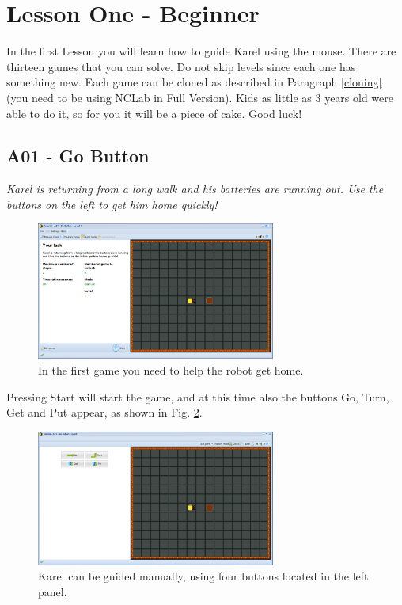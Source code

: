 \documentclass[article,A4,12pt]{llncs}
\begin{document}
\section{Lesson One - Beginner}

In the first Lesson you will learn how to guide Karel using the mouse.
There are thirteen games that you can solve. Do not skip levels since each one has something new. Each game can 
be cloned as described in Paragraph \ref{cloning} (you need to be using NCLab in Full Version). 
Kids as little as 3 years old were able to do it, so for you it will be a piece 
of cake. Good luck!

\newpage

\subsection{A01 - Go Button}

{\em Karel is returning from a long walk and his batteries are running out. 
Use the buttons on the left to get him home quickly! }

\begin{figure}[!ht]
\begin{center}
\includegraphics[width=0.7\textwidth]{img/a01.png}
\end{center}
\vspace{-4mm}
\caption{In the first game you need to help the robot get home.}
\label{fig:a01}
\end{figure}
\noindent
Pressing Start will start 
the game, and at this time also the buttons Go, Turn, Get and Put appear, 
as shown in Fig. \ref{fig:a01b}.

\begin{figure}[!ht]
\begin{center}
\includegraphics[width=0.7\textwidth]{img/a01b.png}
\end{center}
\vspace{-4mm}
\caption{Karel can be guided manually, using four buttons located in the left panel.}
\label{fig:a01b}
\end{figure}
\end{document}
